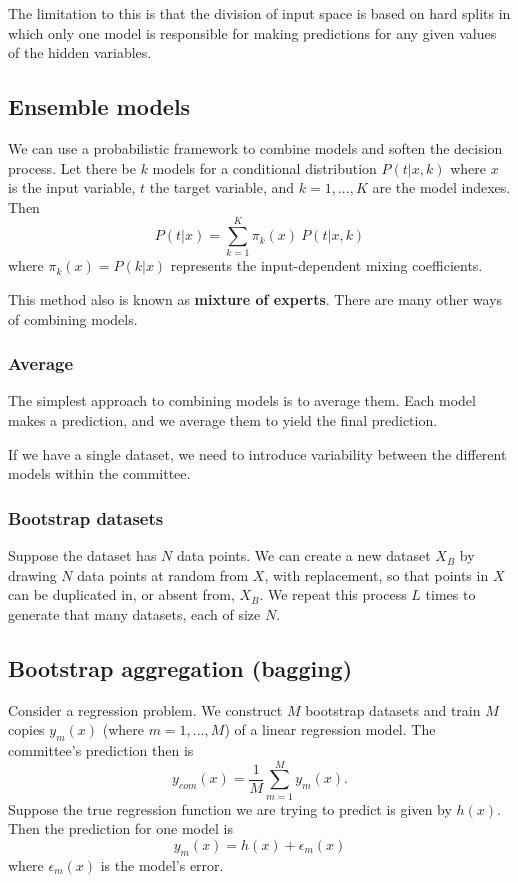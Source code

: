 \documentclass[a4paper,12pt]{article}
\begin{document}
The limitation to this is that the division of input space is based on hard splits in which only one model is responsible for making predictions for any given values of the hidden variables. 

\subsection{Ensemble models}

We can use a probabilistic framework to combine models and soften the decision process. Let there be $k$ models for a conditional distribution $P(t|x,k)$ where $x$ is the input variable, $t$ the target variable, and $k=1,...,K$ are the model indexes. Then
$$P(t|x) = \sum_{k=1}^K \pi_k(x)~P(t|x,k)$$
where $\pi_k(x) = P(k|x)$ represents the input-dependent mixing coefficients. 

This method also is known as \textbf{mixture of experts}. There are many other ways of combining models. 

\subsubsection{Average}

The simplest approach to combining models is to average them. Each model makes a prediction, and we average them to yield the final prediction. 

If we have a single dataset, we need to introduce variability between the different models within the committee. 

\subsubsection{Bootstrap datasets}

Suppose the dataset has $N$ data points. We can create a new dataset $X_B$ by drawing $N$ data points at random from $X$, with replacement, so that  points in $X$ can be duplicated in, or absent from, $X_B$. We repeat this process $L$ times to generate that many datasets, each of size $N$. 


\subsection{Bootstrap aggregation (bagging)}

Consider a regression problem. We construct $M$ bootstrap datasets and train $M$ copies $y_m(x)$ (where $m = 1, ..., M$) of a linear regression model. The committee's prediction then is 
$$y_{com}(x) = \frac{1}{M} \sum_{m=1}^M y_m(x).$$
Suppose the true regression function we are trying to predict is given by $h(x)$. Then the prediction for one model is
$$y_m(x) = h(x) + \epsilon_m(x)$$
where $\epsilon_m(x)$ is the model's error. 
\end{document}
